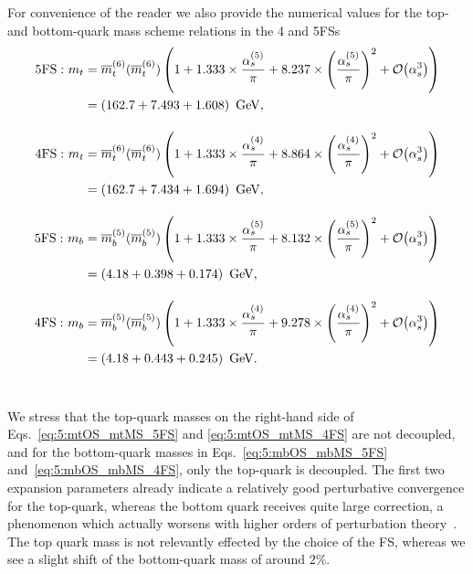 For convenience of the reader we also provide the numerical values for the top- and bottom-quark mass scheme relations in the 4 and 5\acs{FS}s
\begin{align}
\mathrm{5FS: }\ m_t &= \overline{m}^{(6)}_t(\overline{m}^{(6)}_t) \left(1 +  1.333 \times \frac{\alphas^{(5)}}{\pi} + 8.237 \times \left(\frac{\alphas^{(5)}}{\pi}\right)^2 + \BigO{\alphas^3} \right) \notag \\
&= \left(162.7 + 7.493 + 1.608 \right) \ \mathrm{GeV},  \label{eq:5:mtOS_mtMS_5FS} \\[10pt]
\mathrm{4FS: }\ m_t &= \overline{m}^{(6)}_t(\overline{m}^{(6)}_t) \left(1 +  1.333 \times \frac{\alphas^{(4)}}{\pi} + 8.864 \times \left(\frac{\alphas^{(4)}}{\pi}\right)^2 + \BigO{\alphas^3} \right) \notag \\
&= \left(162.7 + 7.434 + 1.694 \right) \ \mathrm{GeV},  \label{eq:5:mtOS_mtMS_4FS} \\[10pt]
\mathrm{5FS: }\ m_b &= \overline{m}^{(5)}_b(\overline{m}^{(5)}_b) \left(1 +  1.333 \times \frac{\alphas^{(5)}}{\pi} + 8.132 \times \left(\frac{\alphas^{(5)}}{\pi}\right)^2 + \BigO{\alphas^3} \right) \notag \\
&= \left(4.18 + 0.398 + 0.174 \right) \ \mathrm{GeV},  \label{eq:5:mbOS_mbMS_5FS} \\[10pt]
\mathrm{4FS: }\ m_b &= \overline{m}^{(5)}_b(\overline{m}^{(5)}_b) \left(1 +  1.333 \times \frac{\alphas^{(4)}}{\pi} + 9.278 \times \left(\frac{\alphas^{(4)}}{\pi}\right)^2 + \BigO{\alphas^3} \right) \notag \\
&= \left(4.18 + 0.443 + 0.245 \right) \ \mathrm{GeV}. \label{eq:5:mbOS_mbMS_4FS} \\[10pt] \notag
\end{align}
We stress that the top-quark masses on the right-hand side of Eqs.~\eqref{eq:5:mtOS_mtMS_5FS} and \eqref{eq:5:mtOS_mtMS_4FS} are not decoupled, and for the bottom-quark masses in Eqs.~\eqref{eq:5:mbOS_mbMS_5FS} and\ \eqref{eq:5:mbOS_mbMS_4FS}, only the top-quark is decoupled. The first two expansion parameters already indicate a relatively good perturbative convergence for the top-quark, whereas the bottom quark receives quite large correction, a phenomenon which actually worsens with higher orders of perturbation theory~\cite{Marquard:2015qpa,Marquard:2016vmy}. The top quark mass is not relevantly effected by the choice of the \acs{FS}, whereas we see a slight shift of the bottom-quark mass of around $2\%$.

